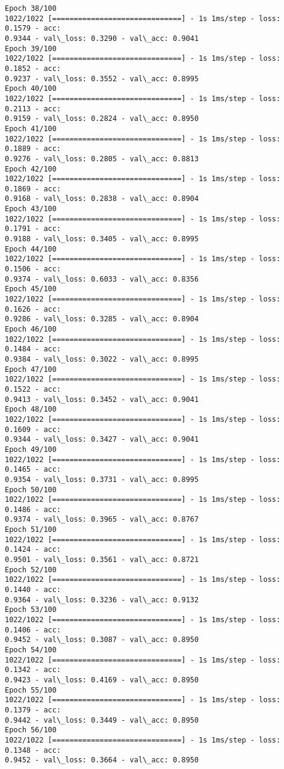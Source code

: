 \documentclass[11pt]{article}
\begin{document}
\begin{Verbatim}[commandchars=\\\{\}]
Epoch 38/100
1022/1022 [==============================] - 1s 1ms/step - loss: 0.1579 - acc:
0.9344 - val\_loss: 0.3290 - val\_acc: 0.9041
Epoch 39/100
1022/1022 [==============================] - 1s 1ms/step - loss: 0.1852 - acc:
0.9237 - val\_loss: 0.3552 - val\_acc: 0.8995
Epoch 40/100
1022/1022 [==============================] - 1s 1ms/step - loss: 0.2113 - acc:
0.9159 - val\_loss: 0.2824 - val\_acc: 0.8950
Epoch 41/100
1022/1022 [==============================] - 1s 1ms/step - loss: 0.1889 - acc:
0.9276 - val\_loss: 0.2805 - val\_acc: 0.8813
Epoch 42/100
1022/1022 [==============================] - 1s 1ms/step - loss: 0.1869 - acc:
0.9168 - val\_loss: 0.2838 - val\_acc: 0.8904
Epoch 43/100
1022/1022 [==============================] - 1s 1ms/step - loss: 0.1791 - acc:
0.9188 - val\_loss: 0.3405 - val\_acc: 0.8995
Epoch 44/100
1022/1022 [==============================] - 1s 1ms/step - loss: 0.1506 - acc:
0.9374 - val\_loss: 0.6033 - val\_acc: 0.8356
Epoch 45/100
1022/1022 [==============================] - 1s 1ms/step - loss: 0.1626 - acc:
0.9286 - val\_loss: 0.3285 - val\_acc: 0.8904
Epoch 46/100
1022/1022 [==============================] - 1s 1ms/step - loss: 0.1484 - acc:
0.9384 - val\_loss: 0.3022 - val\_acc: 0.8995
Epoch 47/100
1022/1022 [==============================] - 1s 1ms/step - loss: 0.1522 - acc:
0.9413 - val\_loss: 0.3452 - val\_acc: 0.9041
Epoch 48/100
1022/1022 [==============================] - 1s 1ms/step - loss: 0.1609 - acc:
0.9344 - val\_loss: 0.3427 - val\_acc: 0.9041
Epoch 49/100
1022/1022 [==============================] - 1s 1ms/step - loss: 0.1465 - acc:
0.9354 - val\_loss: 0.3731 - val\_acc: 0.8995
Epoch 50/100
1022/1022 [==============================] - 1s 1ms/step - loss: 0.1486 - acc:
0.9374 - val\_loss: 0.3965 - val\_acc: 0.8767
Epoch 51/100
1022/1022 [==============================] - 1s 1ms/step - loss: 0.1424 - acc:
0.9501 - val\_loss: 0.3561 - val\_acc: 0.8721
Epoch 52/100
1022/1022 [==============================] - 1s 1ms/step - loss: 0.1440 - acc:
0.9364 - val\_loss: 0.3236 - val\_acc: 0.9132
Epoch 53/100
1022/1022 [==============================] - 1s 1ms/step - loss: 0.1406 - acc:
0.9452 - val\_loss: 0.3087 - val\_acc: 0.8950
Epoch 54/100
1022/1022 [==============================] - 1s 1ms/step - loss: 0.1342 - acc:
0.9423 - val\_loss: 0.4169 - val\_acc: 0.8950
Epoch 55/100
1022/1022 [==============================] - 1s 1ms/step - loss: 0.1379 - acc:
0.9442 - val\_loss: 0.3449 - val\_acc: 0.8950
Epoch 56/100
1022/1022 [==============================] - 1s 1ms/step - loss: 0.1348 - acc:
0.9452 - val\_loss: 0.3664 - val\_acc: 0.8950

\end{Verbatim}
\end{document}
